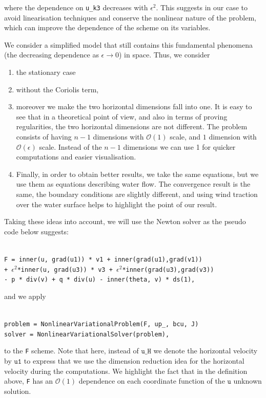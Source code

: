 \documentclass[11pt]{article}
\begin{document}
where the dependence on \texttt{u\_k3} decreases with $\epsilon^2.$ This suggests in our case to avoid linearisation techniques and conserve the nonlinear nature of the problem, which can improve the dependence of the scheme on its variables.

We consider a simplified model that still contains this fundamental phenomena (the decreasing dependence as $\epsilon \to 0$) in space. Thus, we consider

\begin{enumerate}
  \item the stationary case
  \item without the Coriolis term,
  \item moreover we make the two horizontal dimensions fall into one. It is easy to see that in a theoretical point of view, and also in terms of proving regularities, the two horizontal dimensions are not different. The problem consists of having $n-1$ dimensions with $\mathcal{O}(1)$ scale, and $1$ dimension with $\mathcal{O}(\epsilon)$ scale. Instead of the $n-1$ dimensions we can use 1 for quicker computations and easier visualisation.
  \item Finally, in order to obtain better results, we take the same equations, but we use them as equations describing water flow. The convergence result is the same, the boundary conditions are slightly different, and using wind traction over the water surface helps to highlight the point of our result.
\end{enumerate}

Taking these ideas into account, we will use the Newton solver as the pseudo code below suggests:

\texttt{
\\
F = inner(u, grad(u1)) * v1 + inner(grad(u1),grad(v1)) \\
+ $\epsilon^2$*inner(u, grad(u3)) * v3 + $\epsilon^2$*inner(grad(u3),grad(v3)) \\
 - p * div(v)  + q * div(u)  - inner(theta, v) * ds(1), \\
}

and we apply

\texttt{
\\
problem = NonlinearVariationalProblem(F, up\_, bcu, J)\\
solver  = NonlinearVariationalSolver(problem), \\
}

to the \texttt{F} scheme. Note that here, instead of $\texttt{u\_H}$ we denote the horizontal velocity by $\texttt{u1}$ to express that we use the dimension reduction idea for the horizontal velocity during the computations. We highlight the fact that in the definition above, \texttt{F} has an $\mathcal{O}(1)$ dependence on each coordinate function of the $\texttt{u}$ unknown solution.
\end{document}
